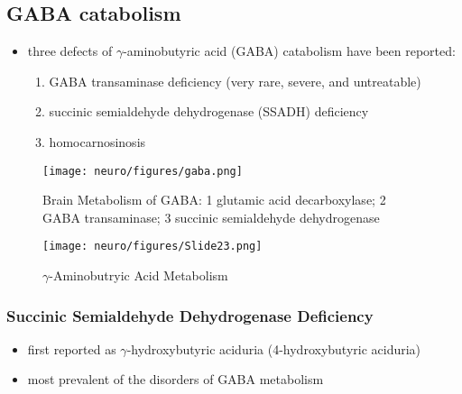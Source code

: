 \documentclass[12pt]{scrartcl}
\begin{document}
\subsection{GABA catabolism}
\label{sec:org7e4522d}
\begin{itemize}
\item three defects of \(\gamma\)-aminobutyric acid (GABA) catabolism have been reported:
\begin{enumerate}
\item GABA transaminase deficiency (very rare, severe, and untreatable)
\item succinic semialdehyde dehydrogenase (SSADH) deficiency
\item homocarnosinosis
\end{enumerate}
\end{itemize}

\begin{figure}[htbp]
\centering
\texttt{[image: neuro/figures/gaba.png]}
\caption{\label{fig:org65ca2d7}Brain Metabolism of GABA: 1 glutamic acid decarboxylase; 2 GABA transaminase; 3 succinic semialdehyde dehydrogenase}
\end{figure}

\begin{figure}[htbp]
\centering
\texttt{[image: neuro/figures/Slide23.png]}
\caption{\label{fig:orgfeea5ab}\(\gamma\)-Aminobutryic Acid Metabolism}
\end{figure}

\subsubsection{Succinic Semialdehyde Dehydrogenase Deficiency}
\label{sec:org25b5f55}
\begin{itemize}
\item first reported as \(\gamma\)-hydroxybutyric aciduria (4-hydroxybutyric
aciduria)
\item most prevalent of the disorders of GABA metabolism
\end{itemize}
\end{document}
